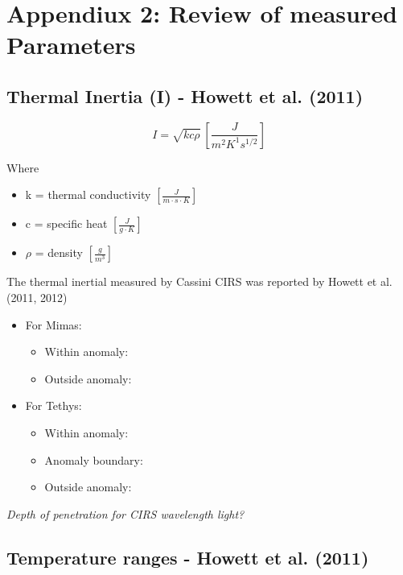 \documentclass[11pt]{article} %
\begin{document}
\section{Appendiux 2: Review of measured Parameters}
\label{sec:measured}

\subsection{Thermal Inertia (I) - Howett et al. (2011)}
\label{sec:inertia}

	\begin{equation}
	I = \sqrt{kc\rho} \: [\frac{J}{m^{2} K^{1} s^{1/2}}]
	\end{equation}

	\hspace{1cm}
	Where
	\begin{itemize}[leftmargin=3cm]
	\item k = thermal conductivity $[\frac{J}{m \cdot s \cdot K}]$
	\item c = specific heat $[\frac{J}{g \cdot K}]$
	\item $\rho$ = density $[\frac{g}{m^{3}}]$
	\end{itemize}

	The thermal inertial measured by Cassini CIRS was reported by Howett et al. (2011, 2012)
	\begin{itemize}
		\item For Mimas:
		\begin{itemize}
			\item Within anomaly: 
			\item Outside anomaly: 
		\end{itemize}
		\item For Tethys:
		\begin{itemize}
			\item Within anomaly: 
			\item Anomaly boundary: 
			\item Outside anomaly: 
		\end{itemize}
	\end{itemize}
		
	\emph{Depth of penetration for CIRS wavelength light?}
	
\subsection{Temperature ranges - Howett et al. (2011)}
\label{sec:temperature}
\end{document}
